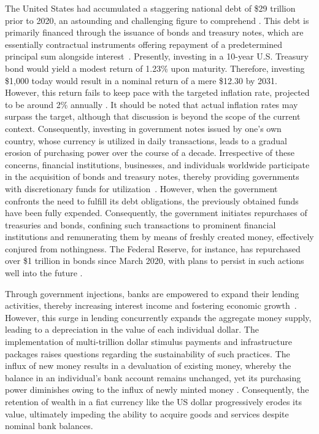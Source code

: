 The United States had accumulated a staggering national debt of \$29 trillion prior to 2020, an astounding and challenging figure to comprehend
\cite{usdebt}. This debt is primarily financed through the issuance of bonds and treasury notes, which are essentially contractual instruments
offering repayment of a predetermined principal sum alongside interest~\cite{treasurysecurities}. Presently, investing in a 10-year U.S.
Treasury bond would yield a modest return of 1.23\% upon maturity. Therefore, investing \$1,000 today would result in a nominal return of a
mere \$12.30 by 2031. However, this return fails to keep pace with the targeted inflation rate, projected to be around 2\% annually
\cite{frbinflation}. It should be noted that actual inflation rates may surpass the target, although that discussion is beyond the scope of the
current context. Consequently, investing in government notes issued by one's own country, whose currency is utilized in daily transactions,
leads to a gradual erosion of purchasing power over the course of a decade. Irrespective of these concerns, financial institutions, businesses,
and individuals worldwide participate in the acquisition of bonds and treasury notes, thereby providing governments with discretionary funds
for utilization~\cite{treasurysecurities}. However, when the government confronts the need to fulfill its debt obligations, the previously
obtained funds have been fully expended. Consequently, the government initiates repurchases of treasuries and bonds, confining such transactions
to prominent financial institutions and remunerating them by means of freshly created money, effectively conjured from nothingness. The Federal
Reserve, for instance, has repurchased over \$1 trillion in bonds since March 2020, with plans to persist in such actions well into the future
\cite{federalreserve}.

Through government injections, banks are empowered to expand their lending activities, thereby increasing interest income and fostering
economic growth~\cite{federalreserve}. However, this surge in lending concurrently expands the aggregate money supply, leading to a depreciation
in the value of each individual dollar. The implementation of multi-trillion dollar stimulus payments and infrastructure packages raises questions
regarding the sustainability of such practices. The influx of new money results in a devaluation of existing money, whereby the balance in an
individual's bank account remains unchanged, yet its purchasing power diminishes owing to the influx of newly minted money
\cite{currencydevaluation}. Consequently, the retention of wealth in a fiat currency like the US dollar progressively erodes its value,
ultimately impeding the ability to acquire goods and services despite nominal bank balances.

